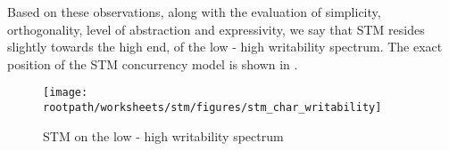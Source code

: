 Based on these observations, along with the evaluation of simplicity, orthogonality, level of abstraction and expressivity, we say that \ac{STM} resides slightly towards the high end, of the low - high writability spectrum. The exact position of the \ac{STM} concurrency model is shown in .

\begin{figure}[htbp]
\centering
 \texttt{[image: \\rootpath/worksheets/stm/figures/stm\_char\_writability]} 
 \caption{\ac{STM} on the low - high writability spectrum}
\label{fig:char_stm_writability}
\end{figure}

\worksheetend
